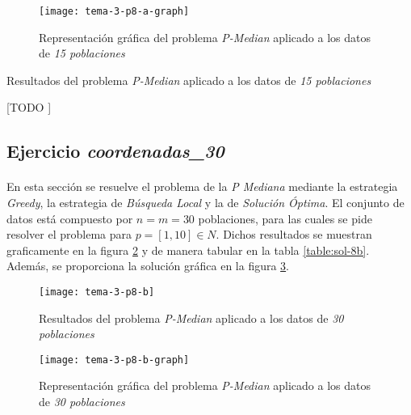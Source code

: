\documentclass[spanish]{article}
\begin{document}
			\begin{figure}[h]
				\begin{center}
					\texttt{[image: tema-3-p8-a-graph]}
				\end{center}
				\caption{Representación gráfica del problema \emph{P-Median} aplicado a los datos de \emph{15 poblaciones}}
				\label{fig:sol-8a-graph}
			\end{figure}

			\begin{table}[h]
				\begin{center}
					\caption{Resultados del problema \emph{P-Median} aplicado a los datos de \emph{15 poblaciones}}
				\end{center}
				\caption{[TODO ]}
				\label{table:sol-8a}
			\end{table}


		\subsection{Ejercicio \emph{coordenadas\_30}}
		\label{sec:e-8b}

			\paragraph{}
			En esta sección se resuelve el problema de la \emph{P Mediana} mediante la estrategia \emph{Greedy}, la estrategia de \emph{Búsqueda Local} y la de \emph{Solución Óptima}. El conjunto de datos está compuesto por $n = m = 30$ poblaciones, para las cuales se pide resolver el problema para $p = [1,10] \in N$. Dichos resultados se muestran graficamente en la figura \ref{fig:sol-8b} y de manera tabular en la tabla \ref{table:sol-8b}. Además, se proporciona la solución gráfica en la figura \ref{fig:sol-8b-graph}.


			\begin{figure}[h]
				\begin{center}
					\texttt{[image: tema-3-p8-b]}
				\end{center}
				\caption{Resultados del problema \emph{P-Median} aplicado a los datos de \emph{30 poblaciones}}
				\label{fig:sol-8b}
			\end{figure}

			\begin{figure}[h]
				\begin{center}
					\texttt{[image: tema-3-p8-b-graph]}
				\end{center}
				\caption{Representación gráfica del problema \emph{P-Median} aplicado a los datos de \emph{30 poblaciones}}
				\label{fig:sol-8b-graph}
			\end{figure}
\end{document}
